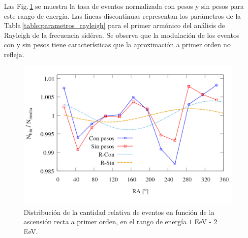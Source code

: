 Las Fig.\,\ref{fig:bin_events_first_order} se muestra la tasa de eventos normalizada con pesos y sin pesos para este rango de energía. Las líneas discontinuas representan los parámetros de la Tabla\,\ref{table:parametros_rayleigh} para el primer armónico del análisis de Rayleigh de la frecuencia sidérea. Se observa que la modulación de los eventos con y sin pesos tiene características que la aproximación a primer orden no refleja. 	
	\begin{figure}[H]
		\centering
		\includegraphics[width=0.8\linewidth]{eventos_clasificados_por_RA_v4.png}
		\caption{Distribución de la cantidad relativa de eventos en función de la ascensión recta a primer orden, en el rango de energía $1$ EeV - $2$ EeV.}
		\label{fig:bin_events_first_order}
	\end{figure}

